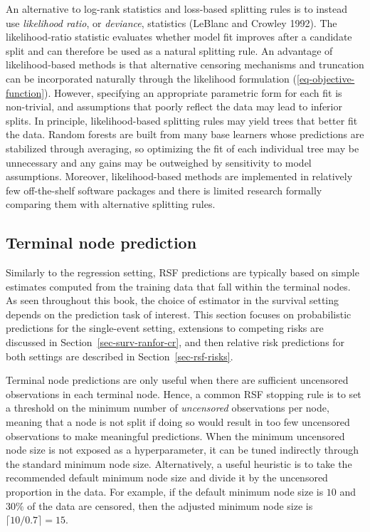 \documentclass[
  letterpaper,
  krantz2]{style/krantz}
\begin{document}
An alternative to log-rank statistics and loss-based splitting rules is
to instead use \emph{likelihood ratio}, or \emph{deviance}, statistics
(LeBlanc and Crowley 1992). The likelihood-ratio statistic evaluates
whether model fit improves after a candidate split and can therefore be
used as a natural splitting
rule. An
advantage of likelihood-based methods is that alternative censoring
mechanisms and truncation can be incorporated naturally through the
likelihood formulation (\ref{eq-objective-function}). However,
specifying an appropriate parametric form for each fit is non-trivial,
and assumptions that poorly reflect the data may lead to inferior
splits. In principle, likelihood-based splitting rules may yield trees
that better fit the data. Random forests are built from many base
learners whose predictions are stabilized through averaging, so
optimizing the fit of each individual tree may be unnecessary and any
gains may be outweighed by sensitivity to model assumptions. Moreover,
likelihood-based methods are implemented in relatively few off-the-shelf
software packages and there is limited research formally comparing them
with alternative splitting rules.

\subsection{Terminal node
prediction}\label{sec-surv-ml-models-ranfor-nodes}

Similarly to the regression setting, RSF predictions are typically based
on simple estimates computed from the training data that fall within the
terminal nodes. As seen throughout this book, the choice of estimator in
the survival setting depends on the prediction task of
interest. This
section focuses on probabilistic predictions for the single-event
setting, extensions to competing risks are discussed in
Section~\ref{sec-surv-ranfor-cr}, and then relative risk predictions for
both settings are described in Section~\ref{sec-rsf-risks}.

Terminal node predictions are only useful when there are sufficient
uncensored observations in each terminal node. Hence, a common RSF
stopping rule is to set a threshold on the minimum number of
\emph{uncensored} observations per node, meaning that a node is not
split if doing so would result in too few uncensored observations to
make meaningful
predictions.
When the minimum uncensored node size is not exposed as a
hyperparameter, it can be tuned indirectly through the standard minimum
node size. Alternatively, a useful heuristic is to take the recommended
default minimum node size and divide it by the uncensored proportion in
the data. For example, if the default minimum node size is \(10\) and
\(30\%\) of the data are censored, then the adjusted minimum node size
is \(\lceil 10/0.7 \rceil = 15\).
\end{document}
